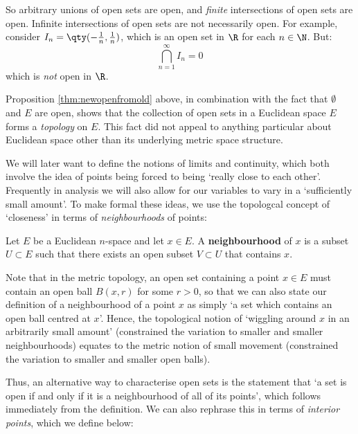 So arbitrary unions of open sets are open, and \emph{finite} intersections of open sets are open. Infinite intersections of open sets are not necessarily open. For example, consider \( I_n=\qty(-\frac{1}{n},\frac{1}{n}) \), which is an open set in \( \R \) for each \( n\in\N \). But:
\[ \bigcap_{n=1}^\infty I_n=\qty{0} \]
which is \emph{not} open in \( \R \).

\vspace{3mm}

Proposition \ref{thm:newopenfromold} above, in combination with the fact that \( \emptyset \) and \( E \) are open, shows that the collection of open sets in a Euclidean space \( E \) forms a \emph{topology} on \( E \). This fact did not appeal to anything particular about Euclidean space other than its underlying metric space structure.

\vspace{3mm}

We will later want to define the notions of limits and continuity, which both involve the idea of points being forced to being `really close to each other'. Frequently in analysis we will also allow for our variables to vary in a `sufficiently small amount'. To make formal these ideas, we use the topologcal concept of `closeness' in terms of \emph{neighbourhoods} of points:

\begin{definition}
  Let \( E \) be a Euclidean \( n \)-space and let \( x\in E \). A \textbf{neighbourhood} of \( x \) is a subset \( U\subset E \) such that there exists an open subset \( V\subset U \) that contains \( x \).
\end{definition}

Note that in the metric topology, an open set containing a point \( x\in E \) must contain an open ball \( B(x,r) \) for some \( r>0 \), so that we can also state our definition of a neighbourhood of a point \( x \) as simply `a set which contains an open ball centred at \( x \)'. Hence, the topological notion of `wiggling around \( x \) in an arbitrarily small amount' (constrained the variation to smaller and smaller neighbourhoods) equates to the metric notion of small movement (constrained the variation to smaller and smaller open balls).

\vspace{3mm}

Thus, an alternative way to characterise open sets is the statement that `a set is open if and only if it is a neighbourhood of all of its points', which follows immediately from the definition. We can also rephrase this in terms of \emph{interior points}, which we define below:

